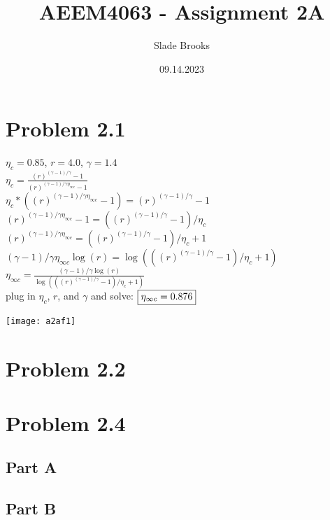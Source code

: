 \documentclass{article}
\title{AEEM4063 - Assignment 2A}
\author{Slade Brooks}
\date{09.14.2023}
\begin{document}
\maketitle

\section*{Problem 2.1}
$\eta_c = 0.85$, $r=4.0$, $\gamma=1.4$ \\
$\eta_c = \frac{(r)^{(\gamma-1)/\gamma}-1}{(r)^{(\gamma-1)/\gamma\eta_{\infty c}}-1}$ \\
$\eta_c*((r)^{(\gamma-1)/\gamma\eta_{\infty c}}-1)=(r)^{(\gamma-1)/\gamma}-1$ \\
$(r)^{(\gamma-1)/\gamma\eta_{\infty c}}-1=((r)^{(\gamma-1)/\gamma}-1)/\eta_c$ \\
$(r)^{(\gamma-1)/\gamma\eta_{\infty c}}=((r)^{(\gamma-1)/\gamma}-1)/\eta_c+1$ \\
$(\gamma-1)/\gamma\eta_{\infty c}\log(r)=\log(((r)^{(\gamma-1)/\gamma}-1)/\eta_c+1)$ \\
$\eta_{\infty c}=\frac{(\gamma-1)/\gamma\log(r)}{\log(((r)^{(\gamma-1)/\gamma}-1)/\eta_c+1)}$ \\
plug in $\eta_c$, $r$, and $\gamma$ and solve:
$\fbox{$\eta_{\infty c}=0.876$}$ \\
\begin{center}
    \texttt{[image: a2af1]}  
\end{center}

\section*{Problem 2.2}

\section*{Problem 2.4}
\subsection*{Part A}
\subsection*{Part B}
\end{document}
